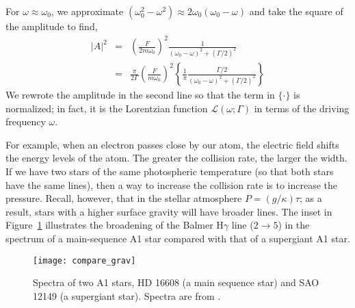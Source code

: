 \begin{sidebar}
For $\omega \approx \omega_0$, we approximate $(\omega_0^2-\omega^2)\approx 2\omega_0(\omega_0-\omega)$ and take the square of the amplitude to find,
\begin{eqnarray}
    \left|A\right|^2 &=& \left(\frac{F}{2m\omega_0}\right)^2
        \frac{1}{(\omega_0-\omega)^2 + (\Gamma/2)^2}\nonumber\\
    &=& \frac{\pi}{2\Gamma}\left(\frac{F}{m\omega_0}\right)^2
        \left\{\frac{1}{\pi}\frac{\Gamma/2}{(\omega_0-\omega)^2 + (\Gamma/2)^2}\right\}
\end{eqnarray}
We rewrote the amplitude in the second line so that the term in $\{\cdot\}$ is normalized; in fact, it is the Lorentzian function $\mathcal{L}(\omega;\Gamma)$ in terms of the driving frequency $\omega$.
\end{sidebar} 

 For example, when an electron passes close by our atom, the electric field shifts the energy levels of the atom.  The greater the collision rate, the larger the width.
If we have two stars of the same photospheric temperature (so that both stars have the same lines), then a way to increase the collision rate is to increase the pressure. Recall, however, that in the stellar atmosphere $P = (g/\kappa)\tau$; as a result, stars with a higher surface gravity will have broader lines. The inset in Figure~\ref{f.compare_grav} illustrates the broadening of the Balmer H$\gamma$ line ($2\to5$) in the spectrum of a main-sequence A1 star compared with that of a supergiant A1 star.

\begin{figure}[hp]
\forcerectofloat
    \texttt{[image: compare\_grav]}
    \caption[Spectra of two A1 stars]{\label{f.compare_grav}
    Spectra of two A1 stars, HD 16608 (a main sequence star) and SAO 12149 (a supergiant star).  Spectra are from \citet{Jacoby1984A-library-of-st}.
    }
\end{figure}
